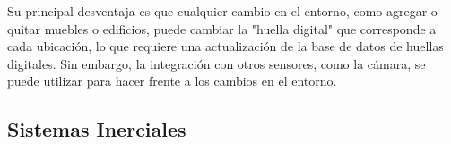 Su principal desventaja es que cualquier cambio en el entorno, como agregar o quitar muebles o edificios, puede cambiar la "huella digital" que corresponde a cada ubicación, lo que requiere una actualización de la base de datos de huellas digitales. Sin embargo, la integración con otros sensores, como la cámara, se puede utilizar para hacer frente a los cambios en el entorno.

\subsection{Sistemas Inerciales}